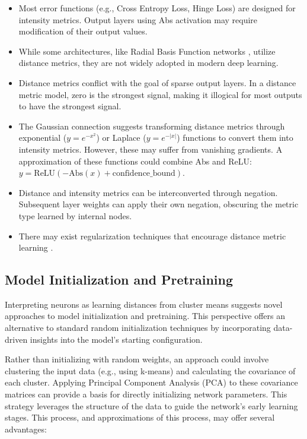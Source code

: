 \begin{itemize}
    \item Most error functions (e.g., Cross Entropy Loss, Hinge Loss) are designed for intensity metrics. Output layers using Abs activation may require modification of their output values.
    \item While some architectures, like Radial Basis Function networks \citep{broomhead1988radial}, utilize distance metrics, they are not widely adopted in modern deep learning.
    \item Distance metrics conflict with the goal of sparse output layers. In a distance metric model, zero is the strongest signal, making it illogical for most outputs to have the strongest signal.
    \item The Gaussian connection suggests transforming distance metrics through exponential ($y=e^{-x^2}$) or Laplace ($y=e^{-|x|}$) functions to convert them into intensity metrics. However, these may suffer from vanishing gradients. A approximation of these functions could combine Abs and ReLU: $y=\text{ReLU}(-\text{Abs}(x) + \text{confidence\_bound})$.
    \item Distance and intensity metrics can be interconverted through negation. Subsequent layer weights can apply their own negation, obscuring the metric type learned by internal nodes.
    \item There may exist regularization techniques that encourage distance metric learning \citep{weinberger2009distance}.
\end{itemize}

\subsection{Model Initialization and Pretraining}

Interpreting neurons as learning distances from cluster means suggests novel approaches to model initialization and pretraining. This perspective offers an alternative to standard random initialization techniques \citep{kamilov2017survey} by incorporating data-driven insights into the model's starting configuration.

Rather than initializing with random weights, an approach could involve clustering the input data (e.g., using k-means) and calculating the covariance of each cluster. Applying Principal Component Analysis (PCA) to these covariance matrices can provide a basis for directly initializing network parameters. This strategy leverages the structure of the data to guide the network's early learning stages. This process, and approximations of this process, may offer several advantages:

